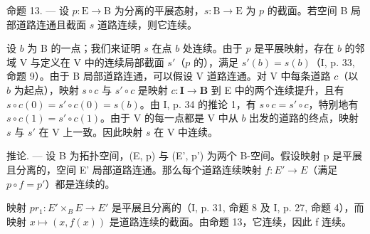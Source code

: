 命题 13. --- 设 \(p \colon \mathrm{E} \to \mathrm{B}\) 为分离的平展态射，\(s \colon \mathrm{B} \to \mathrm{E}\) 为 \(p\) 的截面。若空间 B 局部道路连通且截面 \(s\) 道路连续，则它连续。

设 \(b\) 为 B 的一点；我们来证明 \(s\) 在点 \(b\) 处连续。由于 \(p\) 是平展映射，存在 \(b\) 的邻域 V 与定义在 V 中的连续局部截面 \(s'\)（\(p\) 的），满足 \(s'(b) = s(b)\)（I, p. 33, 命题 9）。由于 B 局部道路连通，可以假设 V 道路连通。对 V 中每条道路 \(c\)（以 \(b\) 为起点），映射 \(s \circ c\) 与 \(s' \circ c\) 是映射 \(c \colon \mathbf{I} \to \mathbf{B}\) 到 E 中的两个连续提升，且有 \(s \circ c(0) = s' \circ c(0) = s(b)\)。由 I, p. 34 的推论 1，有 \(s \circ c = s' \circ c\)，特别地有 \(s \circ c(1) = s' \circ c(1)\)。由于 V 的每一点都是 V 中从 \(b\) 出发的道路的终点，映射 \(s\) 与 \(s'\) 在 V 上一致。因此映射 \(s\) 在 V 中连续。

推论. --- 设 B 为拓扑空间，(E, p) 与 (E', p') 为两个 B-空间。假设映射 p 是平展且分离的，空间 E' 局部道路连通。那么每个道路连续映射 \(f: E' \to E\)（满足 \(p \circ f = p'\)）都是连续的。

映射 \(pr_{1}: E'\times_{B} E \rightarrow E'\) 是平展且分离的（I, p. 31, 命题 8 及 I, p. 27, 命题 4），而映射 \(x \mapsto (x, f(x))\) 是道路连续的截面。由命题 13，它连续，因此 f 连续。

